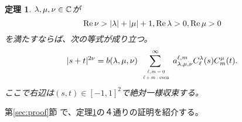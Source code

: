 \documentclass[12pt,a4paper,dvipdfmx]{jsarticle}
\numberwithin{equation}{section}
\newcommand{\myre}[1]{\tmop{Re} #1}
\newcommand{\tmop}[1]{\ensuremath{\operatorname{#1}}}
\theoremstyle{jplain}
\newtheorem{thm}{定理}[section]
\theoremstyle{remark}
\theoremstyle{definition}
\begin{document}
	\begin{thm}\label{prop:exp-st-gg}
		$\lambda,\mu,\nu\in\mathbb{C}$が\begin{equation*}
			\myre{\nu}>\myabs{\lambda}+\myabs{\mu}+1,\myre{\lambda}>0,\myre{\mu}>0
		\end{equation*}を満たすならば、次の等式が成り立つ。
		\begin{equation}
			| s + t |^{2 \nu} =b(\lambda,\mu,\nu) \displaystyle\sum_{\scalebox{0.6}{ $\begin{array}[]{c}
			\ell, m = 0 \\ \ell + m : \tmop{even}
		\end{array}$}}^{\infty} a_{\lambda,\mu,\nu}^{\ell,m} C_\ell^{\lambda} (s) C_m^{\mu} (t).
			\label{eqn:exp-st-gg}
		\end{equation}
		ここで右辺は$(s,t)\in[-1,1]^2$で絶対一{様}収束する。
	\end{thm}
	第\ref{sec:proof}節
	で、定理\ref{prop:exp-st-gg}の４通りの証明を紹介する。
\end{document}
